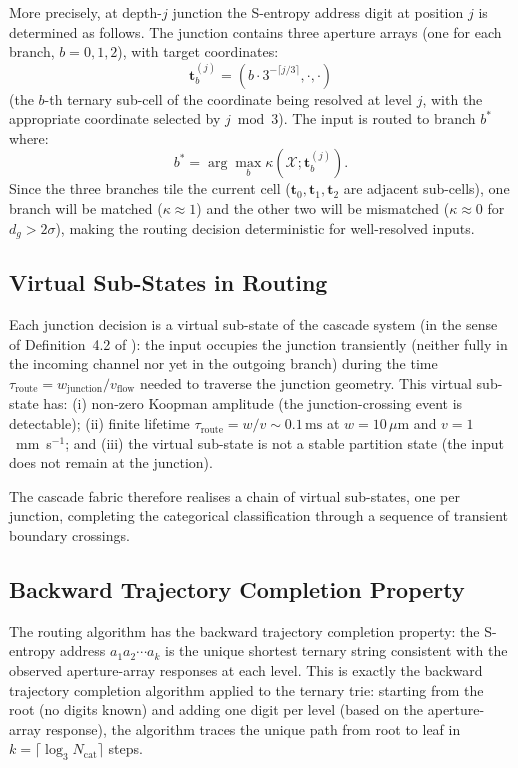 \documentclass[11pt,twocolumn,a4paper]{article}
\theoremstyle{remark}
\newcommand{\kap}{\kappa}
\begin{document}
More precisely, at depth-$j$ junction the S-entropy address digit at position $j$
is determined as follows. The junction contains three aperture arrays (one for
each branch, $b = 0, 1, 2$), with target coordinates:
\begin{equation}
\mathbf{t}_b^{(j)} = \left(b \cdot 3^{-\lceil j/3 \rceil}, \cdot, \cdot\right)
\label{eq:target}
\end{equation}
(the $b$-th ternary sub-cell of the coordinate being resolved at level $j$,
with the appropriate coordinate selected by $j \bmod 3$). The input is
routed to branch $b^*$ where:
\begin{equation}
b^* = \arg\max_b \kap(\mathcal{X}; \mathbf{t}_b^{(j)}).
\label{eq:routing}
\end{equation}
Since the three branches tile the current cell ($\mathbf{t}_0, \mathbf{t}_1,
\mathbf{t}_2$ are adjacent sub-cells), one branch will be matched ($\kap \approx 1$)
and the other two will be mismatched ($\kap \approx 0$ for $d_g > 2\sigma$),
making the routing decision deterministic for well-resolved inputs.

\subsection{Virtual Sub-States in Routing}

Each junction decision is a virtual sub-state of the cascade system (in the sense
of Definition~4.2 of \citep{companion3}): the input occupies the junction transiently
(neither fully in the incoming channel nor yet in the outgoing branch) during
the time $\tau_{\mathrm{route}} = w_{\mathrm{junction}} / v_{\mathrm{flow}}$
needed to traverse the junction geometry. This virtual sub-state has:
(i) non-zero Koopman amplitude (the junction-crossing event is detectable);
(ii) finite lifetime $\tau_{\mathrm{route}} = w / v \sim 0.1\,\mathrm{ms}$ at
$w = 10\,\mu$m and $v = 1$~mm~s$^{-1}$; and
(iii) the virtual sub-state is not a stable partition state (the input does not
remain at the junction).

The cascade fabric therefore realises a chain of virtual sub-states, one per
junction, completing the categorical classification through a sequence of transient
boundary crossings.

\subsection{Backward Trajectory Completion Property}

The routing algorithm has the backward trajectory completion property: the
S-entropy address $a_1 a_2 \cdots a_k$ is the unique shortest ternary string
consistent with the observed aperture-array responses at each level. This is
exactly the backward trajectory completion algorithm applied to the ternary trie:
starting from the root (no digits known) and adding one digit per level (based
on the aperture-array response), the algorithm traces the unique path from root
to leaf in $k = \lceil\log_3 N_{\mathrm{cat}}\rceil$ steps.
\end{document}
